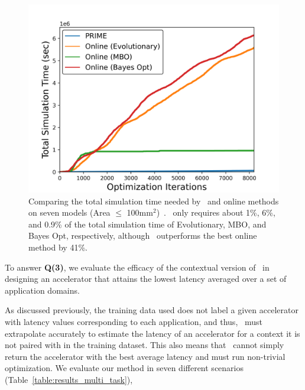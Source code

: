 \begin{figure}
    \centering
    \vspace{-0.5cm}
    \includegraphics[width=0.98\linewidth]{chapters/prime/figs/motivation/convergence_time_seven_models.png}
    \vspace{-0.25cm}
    \caption{\footnotesize{Comparing the total simulation time needed by \primemethodname\ and online methods on seven models (Area $\leq$ 100mm$^2$)~. \primemethodname\ only requires about 1\%, 6\%, and 0.9\% of the total simulation time of Evolutionary, MBO, and Bayes Opt, respectively, although \primemethodname\ outperforms the best online method by 41\%.}}
    \vspace{-0.6cm}
    \label{fig:convergence_time_seven_models}
\end{figure}
%
To answer \textbf{Q(3)}, we evaluate the efficacy of the contextual version of \primemethodname\ in designing an accelerator that attains the lowest latency averaged over a set of application domains.
%

%
As discussed previously, the training data used does not label a given accelerator with latency values corresponding to each application, and thus, \primemethodname\ must extrapolate accurately to estimate the latency of an accelerator for a context it is not paired with in the training dataset.
%
This also means that \primemethodname\ cannot simply return the accelerator with the best average latency and must run non-trivial optimization. 
%
We evaluate our method in seven different scenarios (Table~\ref{table:results_multi_task}), 

